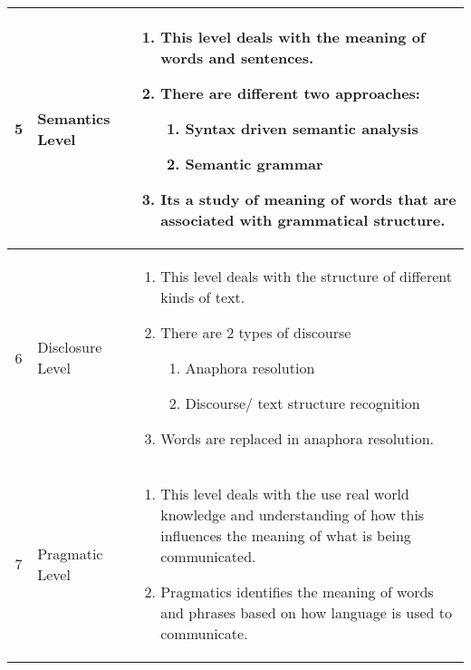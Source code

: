 \begin{alternateColorTable}
\begin{longtable}{|c|m{2.7cm}|m{10cm}|}
    5 & Semantics Level & \begin{enumerate}
        \item This level deals with the meaning of words and sentences.
        \item There are different two approaches:
        \begin{enumerate}
            \item Syntax driven semantic analysis
            \item Semantic grammar
        \end{enumerate} 
        \item Its a study of meaning of words that are associated with grammatical structure.
    \end{enumerate} \\ \hline

    6 & Disclosure Level & \begin{enumerate}
        \item This level deals with the structure of different kinds of text.
        \item There are 2 types of discourse
        \begin{enumerate}
            \item Anaphora resolution
            \item Discourse/ text structure recognition
        \end{enumerate}
        \item Words are replaced in anaphora resolution.
    \end{enumerate} \\ \hline

    7 & Pragmatic Level & \begin{enumerate}
        \item This level deals with the use real world knowledge and understanding of how this influences the meaning of what is being communicated.
        \item Pragmatics identifies the meaning of words and phrases based on how language is used to communicate.
    \end{enumerate}

\end{longtable}
\end{alternateColorTable}






























